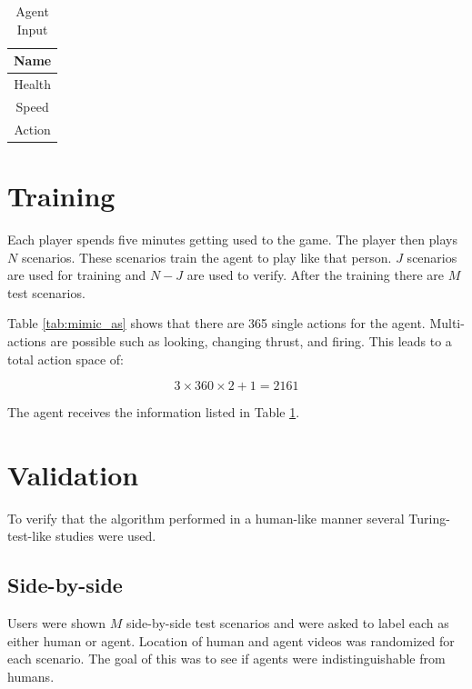 \documentclass[12pt]{thesis}
\begin{document}
\begin{table}
  \caption{Agent Input}
  \begin{center}
    \begin{tabular}{ | c | }
      \hline
      \bf Name \\ \hline
      \hline
      Health \\ \hline
      Speed \\ \hline
      Action \\ \hline
      \hline
    \end{tabular}
  \end{center}
  \label{tab:agent_input}
\end{table}

\section{Training}
Each player spends five minutes getting used to the game. The player then plays 
$N$ %
scenarios. These scenarios train the agent to play like that person. $J$ 
scenarios are used for training and $N - J$ are used to verify. After 
the training there are $M$ %
test scenarios. 

Table \ref{tab:mimic_as} shows that there are 365 single actions for the agent. 
Multi-actions are possible such as looking, changing thrust, and firing. This 
leads to a total action space of:

$$ 3 \times 360 \times 2 + 1 = 2161$$

The agent receives the information listed in Table \ref{tab:agent_input}.


\section{Validation}
To verify that the algorithm performed in a human-like manner several 
Turing-test-like studies were used. 

\subsection{Side-by-side}
Users were shown $M$ side-by-side test scenarios and were asked to label each 
as either human or agent. Location of human and agent videos was randomized for 
each scenario. The goal of this was to see if agents were indistinguishable 
from humans.
\end{document}
